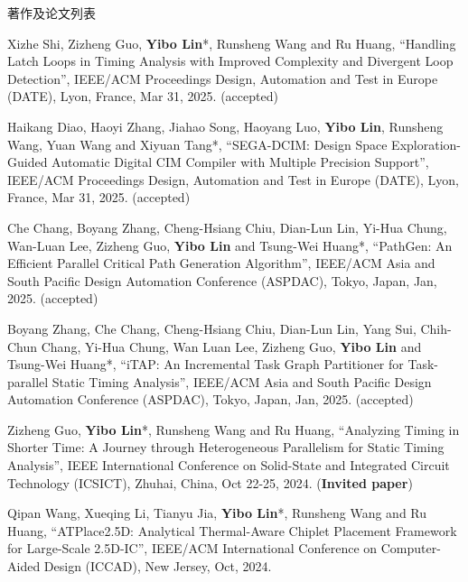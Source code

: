 \begin{rSection}{著作及论文列表}
\begin{description}[font=\normalfont, rightmargin=2em]
\item[{[C170]}]{
        Xizhe Shi, Zizheng Guo, \textbf{Yibo Lin}*, Runsheng Wang and Ru Huang, 
    ``Handling Latch Loops in Timing Analysis with Improved Complexity and Divergent Loop Detection'', 
    IEEE/ACM Proceedings Design, Automation and Test in Europe (DATE), Lyon, France, Mar 31, 2025.
    (accepted)
}
            

\item[{[C169]}]{
        Haikang Diao, Haoyi Zhang, Jiahao Song, Haoyang Luo, \textbf{Yibo Lin}, Runsheng Wang, Yuan Wang and Xiyuan Tang*, 
    ``SEGA-DCIM: Design Space Exploration-Guided Automatic Digital CIM Compiler with Multiple Precision Support'', 
    IEEE/ACM Proceedings Design, Automation and Test in Europe (DATE), Lyon, France, Mar 31, 2025.
    (accepted)
}
            

\item[{[C168]}]{
        Che Chang, Boyang Zhang, Cheng-Hsiang Chiu, Dian-Lun Lin, Yi-Hua Chung, Wan-Luan Lee, Zizheng Guo, \textbf{Yibo Lin} and Tsung-Wei Huang*, 
    ``PathGen: An Efficient Parallel Critical Path Generation Algorithm'', 
    IEEE/ACM Asia and South Pacific Design Automation Conference (ASPDAC), Tokyo, Japan, Jan, 2025.
    (accepted)
}
            

\item[{[C167]}]{
        Boyang Zhang, Che Chang, Cheng-Hsiang Chiu, Dian-Lun Lin, Yang Sui, Chih-Chun Chang, Yi-Hua Chung, Wan Luan Lee, Zizheng Guo, \textbf{Yibo Lin} and Tsung-Wei Huang*, 
    ``iTAP: An Incremental Task Graph Partitioner for Task-parallel Static Timing Analysis'', 
    IEEE/ACM Asia and South Pacific Design Automation Conference (ASPDAC), Tokyo, Japan, Jan, 2025.
    (accepted)
}
            

\item[{[C166]}]{
        Zizheng Guo, \textbf{Yibo Lin}*, Runsheng Wang and Ru Huang, 
    ``Analyzing Timing in Shorter Time: A Journey through Heterogeneous Parallelism for Static Timing Analysis'', 
    IEEE International Conference on Solid-State and Integrated Circuit Technology (ICSICT), Zhuhai, China, Oct 22-25, 2024.
    (\textbf{Invited paper})
}
            

\item[{[C165]}]{
        Qipan Wang, Xueqing Li, Tianyu Jia, \textbf{Yibo Lin}*, Runsheng Wang and Ru Huang, 
    ``ATPlace2.5D: Analytical Thermal-Aware Chiplet Placement Framework for Large-Scale 2.5D-IC'', 
    IEEE/ACM International Conference on Computer-Aided Design (ICCAD), New Jersey, Oct, 2024.
    
}
\end{description}
\end{rSection}
